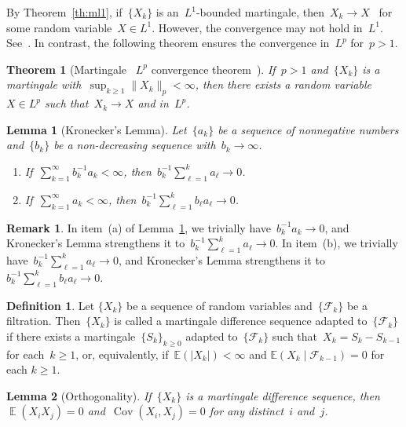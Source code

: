 \documentclass[12pt,a4paper]{article}  %
\newcounter{cite}
\newtheorem{theorem}{Theorem}[section]
\newtheorem{lemma}{Lemma}[section]
\theoremstyle{definition}
\newtheorem{definition}{Definition}[section]
\newtheorem{remark}{Remark}[section]
\numberwithin{equation}{section}
\newcommand{\FF}{\mathcal{F}}
\newcommand{\as}{{\text{a.s.}}\xspace}
\DeclareMathOperator{\cov}{Cov}
\DeclareMathOperator{\expc}{\mathbb{E}}
\begin{document}
By Theorem~\ref{th:ml1}, if~$\{X_k\}$ is an~$L^1$-bounded martingale,
then~$X_k\to X$~\as for some random variable~$X\in L^1$. However, the convergence may not hold
in~$L^1$. See~\cite[Example 4.2.13]{Durrett_2019}. In contrast, the following theorem ensures
the convergence in~$L^p$ for~$p>1$.

\begin{theorem}[Martingale ~$L^p$ convergence theorem~\mbox{\cite[Theorem~4.4.6]{Durrett_2019}}] \label{th:mlp}
    If~$p> 1$ and~$\{X_k\}$ is a martingale with~$\sup_{k\ge 1} \|X_k\|_p< \infty$,
    then there exists a random variable~$X\in L^p$ such that~$X_k\to X$ \as and in~$L^p$.
\end{theorem}

\begin{lemma}[Kronecker's Lemma]
    \label{lem:kronecker}
    Let~$\{a_k\}$ be a sequence of nonnegative numbers and~$\{b_k\}$ be a non-decreasing sequence
    with~$b_k\to \infty$.
    \begin{enumerate}
        \item If~$\sum_{k=1}^\infty b_k^{-1}a_k < \infty$, then~$b_k^{-1}\sum_{\ell=1}^k a_\ell\to 0$.
        \item If~$\sum_{k=1}^\infty a_k < \infty$, then~$b_k^{-1}\sum_{\ell=1}^k b_\ell a_\ell\to 0$.
    \end{enumerate}
\end{lemma}

\begin{remark}
    \label{rem:kronecker}
    In item~(a) of Lemma~\ref{lem:kronecker}, we trivially have~$b_k^{-1} a_k\to 0$,
    and Kronecker's Lemma strengthens it to~$b_k^{-1}\sum_{\ell=1}^k a_\ell\to 0$.
    In item~(b), we trivially have~$b_k^{-1} \sum_{\ell=1}^k a_\ell\to 0$,
    and Kronecker's Lemma strengthens it to~$b_k^{-1}\sum_{\ell=1}^k b_\ell a_\ell\to 0$.
\end{remark}

\begin{definition}
    \label{def:md}
    Let $\{X_k\}$ be a sequence of random variables and~$\{\FF_k\}$ be a filtration.
    Then~$\{X_k\}$ is called a martingale difference sequence
    adapted to~$\{\FF_k\}$ if there exists a martingale~$\{S_k\}_{k\ge 0}$ adapted to~$\{\FF_k\}$
    such that~$X_k = S_k - S_{k-1}$ for each~$k\ge 1$, or, equivalently,
    if~$\mathbb{E}(|X_k|) < \infty$ and $\mathbb{E}(X_k \mathrel{|} \FF_{k-1}) = 0$ \as for each $k \ge 1$.
\end{definition}

\begin{lemma}[Orthogonality]
    \label{lem:orth}
    If~$\{X_k\}$ is a martingale difference sequence, then
    $\expc(X_iX_j) = 0$ and~$\cov(X_i, X_j) = 0$ for any distinct~$i$ and~$j$.
\end{lemma}
\end{document}
